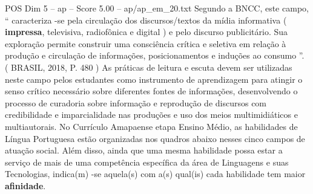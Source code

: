 \begin{textsample}{POS Dim 5 – ap – Score 5.00 – ap/ap\_em\_20.txt}
Segundo a BNCC, este campo, “ caracteriza -se pela circulação dos discursos/textos da mídia informativa ( \textbf{impressa}, televisiva, radiofônica e digital ) e pelo discurso publicitário.
Sua exploração permite construir uma consciência crítica e seletiva em relação à produção e circulação de informações, posicionamentos e induções ao consumo ”. ( BRASIL, 2018, P. 480 ) As práticas de leitura e escuta devem ser utilizadas neste campo pelos estudantes como instrumento de aprendizagem para atingir o senso crítico necessário sobre diferentes fontes de informações, desenvolvendo o processo de curadoria sobre informação e reprodução de discursos com credibilidade e imparcialidade nas produções e uso dos meios multimidiáticos e multiautorais.
No Currículo Amapaense etapa Ensino Médio, as habilidades de Língua Portuguesa estão organizadas nos quadros abaixo nesses cinco campos de atuação social.
Além disso, ainda que uma mesma habilidade possa estar a serviço de mais de uma competência específica da área de Linguagens e suas Tecnologias, indica(m) -se aquela(s) com a(s) qual(is) cada habilidade tem maior \textbf{afinidade}.

\end{textsample}
